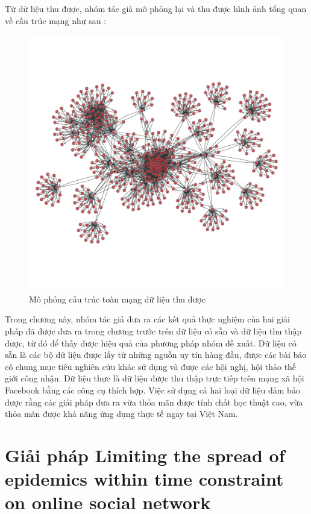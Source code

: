 \begin {itemize}
Từ dữ liệu thu được, nhóm tác giả mô phỏng lại và thu được hình ảnh tổng quan về cấu trúc mạng như sau :

\begin{center}
	\begin{figure}[htp]
		\begin{center}
			\includegraphics [scale=.5]{picture/Net}
		\end{center}
		\caption{Mô phỏng cấu trúc toàn mạng dữ liệu thu được}
		\label{refhinh3_2}
	\end{figure}
\end{center}
\end {itemize}
Trong chương này, nhóm tác giả đưa ra các kết quả thực nghiệm của hai giải pháp đã được đưa ra trong chương trước trên dữ liệu có sẵn và dữ liệu thu thập được, từ đó để thấy được hiệu quả của phương pháp nhóm đề xuất. Dữ liệu có sẵn là các bộ dữ liệu được lấy từ những nguồn uy tín hàng đầu, được các bài báo có chung mục tiêu nghiên cứu khác sử dụng và được các hội nghị, hội thảo thế giới công nhận. Dữ liệu thực là dữ liệu được thu thập trực tiếp trên mạng xã hội Facebook bằng các công cụ thích hợp. Việc sử dụng cả hai loại dữ liệu đảm bảo được rằng các giải pháp đưa ra vừa thỏa mãn được tính chất học thuật cao, vừa thỏa mãn được khả năng ứng dụng thực tế ngay tại Việt Nam.

\section{Giải pháp Limiting the spread of epidemics within time constraint on online social network}
